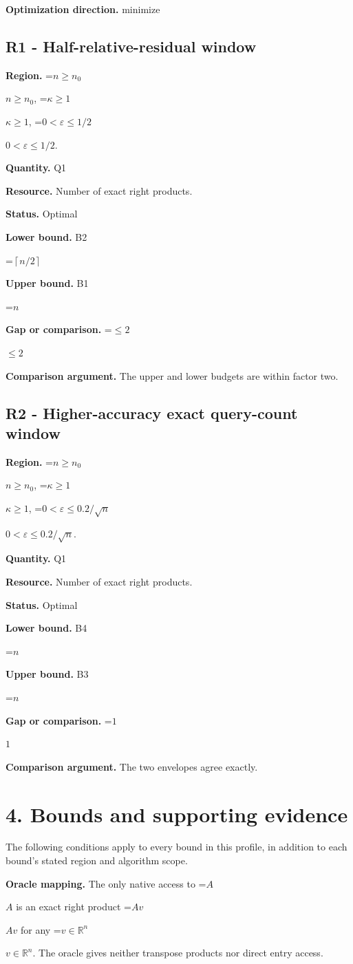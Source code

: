 \documentclass[10pt,a4paper]{article}
\newcommand{\AtlasMath}[1]{\par\begingroup\centering\setbox0=\hbox{$\displaystyle #1$}\ifdim\wd0>1.4\linewidth\typeout{ATLAS WIDE FORMULA: \the\wd0}\fi\ifdim\wd0>\linewidth\resizebox{\linewidth}{!}{\box0}\else\box0\fi\par\endgroup}
\newcommand{\AtlasInlineMath}[1]{\begingroup\setbox0=\hbox{$#1$}\ifdim\wd0>.4\linewidth\endgroup\AtlasMath{#1}\else\endgroup$#1$\fi}
\begin{document}
\textbf{Optimization direction.} minimize

\subsection{R1 - Half-relative-residual window}
\textbf{Region.} \AtlasInlineMath{n\ge n_0}, \AtlasInlineMath{\kappa\ge1}, \AtlasInlineMath{0<\varepsilon\le 1/2}.

\textbf{Quantity.} Q1

\textbf{Resource.} Number of exact right products.

\textbf{Status.} Optimal

\textbf{Lower bound.} B2

\AtlasMath{\left\lceil n/2\right\rceil}
\textbf{Upper bound.} B1

\AtlasMath{n}
\textbf{Gap or comparison.} \AtlasInlineMath{\le2}

\textbf{Comparison argument.} The upper and lower budgets are within factor two.

\subsection{R2 - Higher-accuracy exact query-count window}
\textbf{Region.} \AtlasInlineMath{n\ge n_0}, \AtlasInlineMath{\kappa\ge1}, \AtlasInlineMath{0<\varepsilon\le 0.2/\sqrt n}.

\textbf{Quantity.} Q1

\textbf{Resource.} Number of exact right products.

\textbf{Status.} Optimal

\textbf{Lower bound.} B4

\AtlasMath{n}
\textbf{Upper bound.} B3

\AtlasMath{n}
\textbf{Gap or comparison.} \AtlasInlineMath{1}

\textbf{Comparison argument.} The two envelopes agree exactly.

\section{4. Bounds and supporting evidence}
The following conditions apply to every bound in this profile, in addition to each bound's stated region and algorithm scope.

\textbf{Oracle mapping.} The only native access to \AtlasInlineMath{A} is an exact right product \AtlasInlineMath{Av} for any \AtlasInlineMath{v\in\mathbb R^n}. The oracle gives neither transpose products nor direct entry access.
\end{document}
